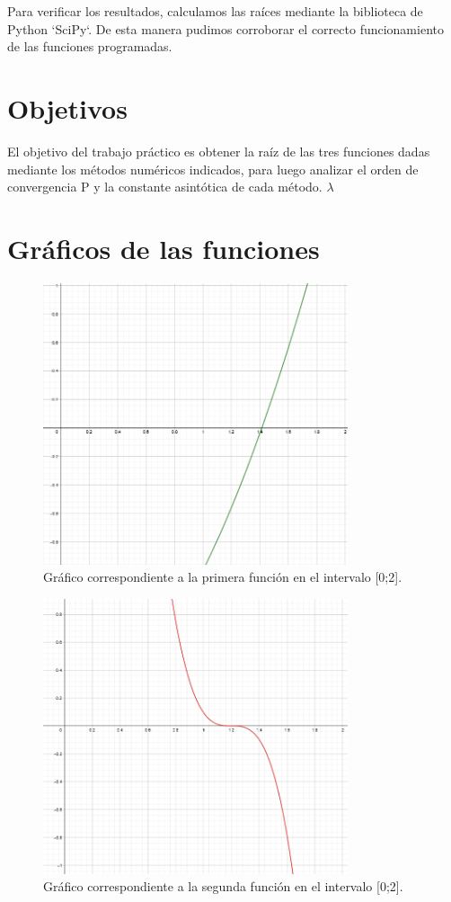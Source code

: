 \documentclass[titlepage,a4paper]{article}
\begin{document}
Para verificar los resultados, calculamos las raíces mediante la biblioteca de Python `SciPy`. De esta manera pudimos corroborar el correcto funcionamiento de las funciones programadas.

\section{Objetivos}\label{sec:objetivos}
El objetivo del trabajo práctico es obtener la raíz de las tres funciones dadas mediante los métodos numéricos indicados, para luego analizar el orden de convergencia P y la constante asintótica de cada método. $\lambda$


\section{Gráficos de las funciones}\label{sec:graficosfun}

\begin{figure}[H]
\centering
\includegraphics[width=0.8\textwidth]{funcion1.png}
\caption{\label{fig:class01}Gráfico correspondiente a la primera función en el intervalo [0;2].}
\end{figure}

\begin{figure}[H]
\centering
\includegraphics[width=0.8\textwidth]{funcion2.png}
\caption{\label{fig:class01}Gráfico correspondiente a la segunda función en el intervalo [0;2].}
\end{figure}
\end{document}
